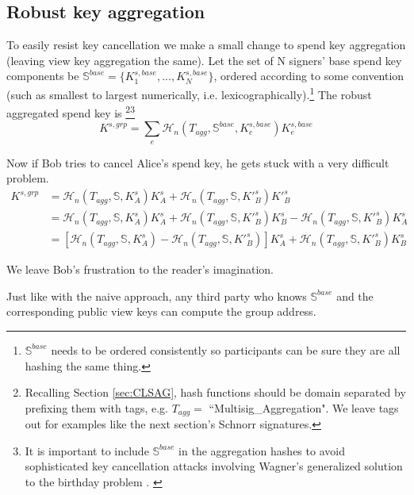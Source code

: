 \subsection{Robust key aggregation}
\label{sec:robust-key-aggregation}

To easily resist key cancellation we make a small change to spend key aggregation (leaving view key aggregation the same). Let the set of N signers' base spend key components be $\mathbb{S}^{base} = \{K^{s,base}_1,...,K^{s,base}_N\}$, ordered according to some convention (such as smallest to largest numerically, i.e. lexicographically).\footnote{$\mathbb{S}^{base}$ needs to be ordered consistently so participants can be sure they are all hashing the same thing.} The robust aggregated spend key is \cite{MRL-0009-multisig}\footnote{Recalling Section \ref{sec:CLSAG}, hash functions should be domain separated by prefixing them with tags, e.g. $T_{agg} =$ ``Multisig\_Aggregation". We leave tags out for examples like the next section's Schnorr signatures.}\footnote{It is important to include $\mathbb{S}^{base}$ in the aggregation hashes to avoid sophisticated key cancellation attacks involving Wagner's generalized solution to the birthday problem \cite{generalized-birthday-wagner}. \cite{adam-wagnerian-tragedies} \cite{maxwell2018simple-musig}}\vspace{.175cm}
\[K^{s,grp} = \sum_e \mathcal{H}_n(T_{agg},\mathbb{S}^{base},K^{s,base}_e)K^{s,base}_e\]

Now if Bob tries to cancel Alice's spend key, he gets stuck with a very difficult problem.\vspace{.175cm}
\begin{align*}
    K^{s,grp} &= \mathcal{H}_n(T_{agg},\mathbb{S},K^{s}_A)K^{s}_A + \mathcal{H}_n(T_{agg},\mathbb{S},K'^{s}_B)K'^{s}_B \\
             &= \mathcal{H}_n(T_{agg},\mathbb{S},K^{s}_A)K^{s}_A + \mathcal{H}_n(T_{agg},\mathbb{S},K'^{s}_B)K^{s}_B - \mathcal{H}_n(T_{agg},\mathbb{S},K'^{s}_B)K^{s}_A \\
             &= [\mathcal{H}_n(T_{agg},\mathbb{S},K^{s}_A) - \mathcal{H}_n(T_{agg},\mathbb{S},K'^{s}_B)]K^{s}_A + \mathcal{H}_n(T_{agg},\mathbb{S},K'^{s}_B)K^{s}_B
\end{align*}

We leave Bob's frustration to the reader's imagination.

Just like with the naive approach, any third party who knows $\mathbb{S}^{base}$ and the corresponding public view keys can compute the group address.

